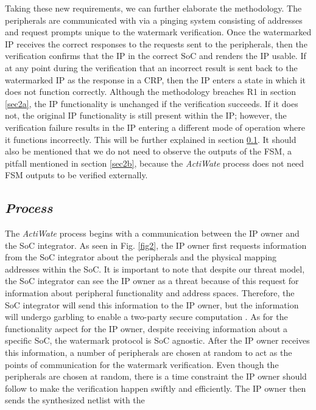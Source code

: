 \documentclass[onecolumn]{IEEEtran}
\begin{document}
Taking these new requirements, we can further elaborate the
methodology. The peripherals are communicated with via a pinging
system consisting of addresses and request prompts unique to the
watermark verification. Once the watermarked IP receives the correct
responses to the requests sent to the peripherals, then the verification
confirms that the IP in the correct SoC and renders the IP usable. If at
any point during the verification that an incorrect result is sent back to
the watermarked IP as the response in a CRP, then the IP enters a state
in which it does not function correctly. Although the methodology
breaches R1 in section \ref{sec2a}, the IP functionality is unchanged if the
verification succeeds. If it does not, the original IP functionality is
still present within the IP; however, the verification failure results
in the IP entering a different mode of operation where it functions
incorrectly. This will be further explained in section \ref{sec3b}. It should
also be mentioned that we do not need to observe the outputs of
the FSM, a pitfall mentioned in section \ref{sec2b}, because the \textit{ActiWate}
process does not need FSM outputs to be verified externally.

\subsection{\textit{Process}}
\label{sec3b}
The \textit{ActiWate} process begins with a communication between the
IP owner and the SoC integrator. As seen in Fig. \ref{fig2}, the IP owner first
requests information from the SoC integrator about the peripherals
and the physical mapping addresses within the SoC. It is important
to note that despite our threat model, the SoC integrator can see
the IP owner as a threat because of this request for information
about peripheral functionality and address spaces. Therefore, the
SoC integrator will send this information to the IP owner, but
the information will undergo garbling to enable a two-party secure
computation \cite{Hashemi2022}. As for the functionality aspect for the IP owner,
despite receiving information about a specific SoC, the watermark
protocol is SoC agnostic. After the IP owner receives this information,
a number of peripherals are chosen at random to act as the points
of communication for the watermark verification. Even though the
peripherals are chosen at random, there is a time constraint the IP
owner should follow to make the verification happen swiftly and
efficiently. The IP owner then sends the synthesized netlist with the
\end{document}
